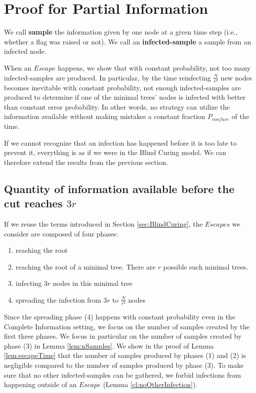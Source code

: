 \section{Proof for Partial Information} \label{sec:partial}
\begin{definition}
We call \textbf{sample} the information given by one node at a given time step (i.e., whether a flag was raised or not). We call an \textbf{infected-sample} a sample from an infected node.
\end{definition}

When an $Escape$ happens, we show that with constant probability, not too many infected-samples are produced. In particular, by the time reinfecting $\frac{N}{r^4}$ new nodes becomes inevitable with constant probability, not enough infected-samples are produced to determine if one of the minimal trees' nodes is infected with better than constant error probability. In other words, no strategy can utilize the information available without making mistakes a constant fraction $P_{confuse}$ of the time.

If we cannot recognize that an infection has happened before it is too late to prevent it, everything is as if we were in the Blind Curing model. We can therefore extend the results from the previous section.

\subsection{Quantity of information available before the cut reaches $3r$}

If we reuse the terms introduced in Section \ref{sec:BlindCuring}, the $Escapes$ we consider are composed of four phases: 
\begin{enumerate}
\item reaching the root
\item reaching the root of a minimal tree. There are $r$ possible such minimal trees.
\item infecting $3r$ nodes in this minimal tree
\item spreading the infection from $3r$ to $\frac{N}{r^4}$ nodes
\end{enumerate}
Since the spreading phase (4) happens with constant probability even in the Complete Information setting, we focus on the number of samples created by the first three phases. We focus in particular on the number of samples created by phase (3) in Lemma \ref{lem:nSamples}. We show in the proof of Lemma \ref{lem:escapeTime} that the number of samples produced by phases (1) and (2) is negligible compared to the number of samples produced by phase (3). To make sure that no other infected-samples can be gathered, we forbid infections from happening outside of an $Escape$ (Lemma \ref{cl:noOtherInfection}).

